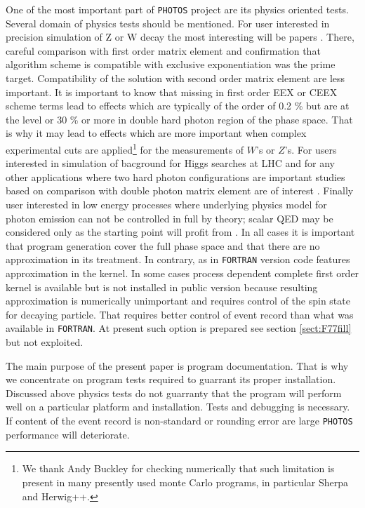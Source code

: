 \documentclass[]{Photos_interface_design}
\begin{document}
One of the most important part of {\tt PHOTOS} project are its physics oriented tests.
Several domain
of physics tests should be mentioned. For user interested in precision 
simulation of Z or W decay the most interesting will be papers \cite{Nanava:2009vg,Golonka:2006tw}. There, careful comparison with first order matrix element 
and confirmation that algorithm scheme  is compatible with exclusive 
exponentiation was the prime target. Compatibility of the solution
with second order matrix element are less important. 
It is important to know that missing in first order EEX or CEEX \cite{koralz4:1994,kkcpc:1999} 
scheme terms
lead to effects which are typically of the order of 0.2 \% but are at the level 
or 30 \% or more in double hard photon region of the phase space. That is 
why it may lead to effects which are more important when complex experimental 
cuts are applied\footnote{We thank Andy Buckley for checking numerically
 that such limitation is present in many presently used monte Carlo programs,
in particular Sherpa and Herwig++.  } 
for the measurements of $W$'s or $Z$'s.
 For users interested in simulation of
bacground for Higgs searches at LHC and for any other applications where 
two hard photon configurations are important studies based on comparison with 
double photon matrix element are of 
interest \cite{Barberio:1993qi,RichterWas:1994ep,RichterWas:1993ta}.
Finally user interested in low energy processes where underlying physics model 
for photon emission can not be controlled in full by theory; scalar QED may 
be considered only as the starting point will profit 
from \cite{Nanava:2009vg,Nanava:2006vv}. In all cases it is important that
 program generation cover the full phase space and that there are no 
approximation in its treatment. In contrary, as in {\tt FORTRAN} version code 
features approximation in the kernel. In some cases process dependent 
complete first order 
kernel is available but is not installed in public version  
because resulting approximation is 
numerically unimportant and requires control of the spin state for decaying 
particle. That requires better control of event record than what was available 
in {\tt FORTRAN}. At present such option is prepared see section \ref{sect:F77fill} but not exploited. 

The main purpose of the present paper is program documentation. That is why
we concentrate on program tests required to guarrant its proper installation.
Discussed above physics tests
do not guarranty that the program will perform well on a particular platform and installation. Tests and debugging
is necessary.  If content of the event record is non-standard or rounding error are large {\tt PHOTOS} performance will deteriorate.
\end{document}

